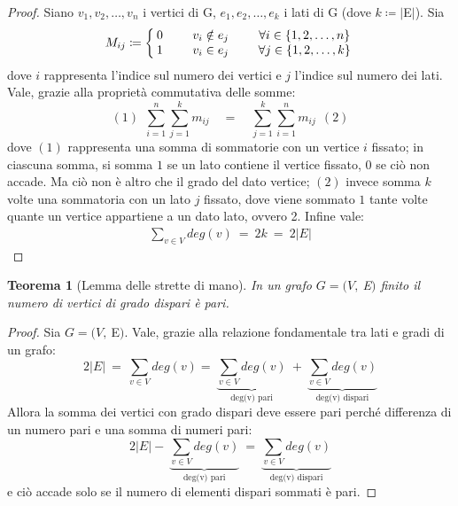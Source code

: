 \documentclass[12pt,twoscolu]{article}
\newcommand{\Eps}{$E\:$}
\newcommand{\MathEps}{E}
\newcommand{\grafo}{(V, \: \Eps)}
\newtheorem{theorem}{Teorema}
\begin{document}
\begin{proof}
Siano $v_1, v_2,\ldots ,v_n$ i vertici di G, $e_1, e_2,\ldots, e_k$ i lati di G (dove $k \coloneqq | \Eps |$). Sia
\[
M_{ij} \coloneqq \left\{
\setlength\arraycolsep{2pt}
\begin{array}{ccc} 0 &\qquad v_i \notin e_j &\qquad \forall i \in \{1, 2, \ldots , n\} \\ \relax
1 &\qquad v_i \in e_j &\qquad \forall j \in \{1, 2, \ldots ,k \} 
\end{array}\right
.
\]
dove $i$ rappresenta l'indice sul numero dei vertici e $j$ l'indice sul numero dei lati. Vale, grazie alla proprietà commutativa delle somme:
$$ (1)\ \ \sum_{i=1}^n \sum_{j=1}^k m_{ij} \quad = \quad \sum_{j=1}^k\sum_{i=1}^n m_{ij}\ \ (2)$$
dove $(1)$ rappresenta una somma di sommatorie con un vertice $i$ fissato; in ciascuna somma, si somma $1$ se un lato contiene il vertice fissato, $0$ se ciò non accade. Ma ciò non è altro che il grado del dato vertice; $(2)$ invece somma $k$ volte una sommatoria con un lato $j$ fissato, dove viene sommato $1$ tante volte quante un vertice appartiene a un dato lato, ovvero 2. Infine vale:
\begin{align*}
 \sum_{v\in V} deg(v) \ = \ 2k \ =\ 2 |\MathEps |
 \end{align*}
\end{proof}

\begin{theorem}[Lemma delle strette di mano]
In un grafo $G = \grafo$ finito il numero di vertici di grado dispari è pari.
\end{theorem}

\begin{proof}
Sia $G = \grafo$. Vale, grazie alla relazione fondamentale tra lati e gradi di un grafo:
\[
2 | \MathEps | \ =\ \sum_{v\in V} deg (v) 
= \ \underbrace{\sum_{v\in V} deg (v)}_{\text{deg(v) pari}} \ + \ \underbrace{\sum_{v\in V} deg (v)}_{\text{deg(v) dispari}}
\]
Allora la somma dei vertici con grado dispari deve essere pari perché differenza di un numero pari e una somma di numeri pari:
\[
2 | \MathEps | - \ \underbrace{\sum_{v\in V} deg (v)}_{\text{deg(v) pari}} \ = \ \underbrace{\sum_{v\in V} deg (v)}_{\text{deg(v) dispari}} 
\]
e ciò accade solo se il numero di elementi dispari sommati è pari.
\end{proof}
\end{document}
